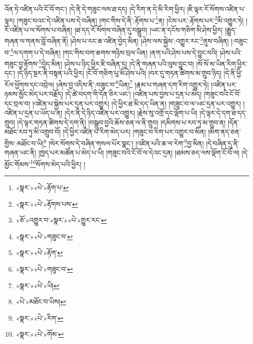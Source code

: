 འོན་ཏེ་འཛིན་པའི་ངོ་བོ་གང་། །དེ་ནི་དེ་གཟུང་ལས་ཐ་དད། །དེ་རིག་ན་དེ་མི་རིག་ཕྱིར། །ཇི་ལྟར་རོ་སོགས་འཛིན་པ་ལྟར། །གཟུང་བའང་དེ་འཛིན་པས་དེ་བཞིན། །གང་གིས་དེ་ནི་:རྟོགས་པ་\footnote{«སྣར་»«པེ་»རྟོག་པ་}ན། །ངེས་པར་:རྟོགས་པར་\footnote{«སྣར་»«པེ་»རྟོགས་པས་}མི་འགྱུར་ཏེ། །རོ་འཛིན་པ་ལ་སོགས་པ་བཞིན། །ཐ་དད་རོ་སོགས་བཞིན་དུ་བསྒྲུབ། །ཡང་ན་དངོས་གཅིག་མི་ཤེས་ཕྱིར། །རྒྱུད་གཞན་ལ་གནས་བློ་བཞིན་ནོ། །ཤེས་པ་རང་ཆ་འཛིན་བྱེད་མིན། །ཤེས་ལས་སྐྱེས་:འགྱུར་རང་\footnote{«ཅོ་»འགྱུར་བ་«སྣར་»«པེ་»གྱུར་རང་}ནུས་བཞིན། །:བཟུང་བ་\footnote{«སྣར་»«པེ་»གཟུང་བ་}ལ་དགག་པ་དེ་བཞིན། །གང་གིས་བག་ཆགས་གཉིས་བྲལ་ཡིན། །ནག་པའི་ཤེས་པས་དེ་བྱུང་བའི། །ཤེས་པའི་གཟུང་བྱ་རྟོགས་\footnote{«སྣར་»«པེ་»རྟོག་}བྱེད་མིན། །ཤེས་པ་ཉིད་ཕྱིར་ཇི་བཞིན་དུ། །དེ་ནི་གཞན་པའི་ལུས་བྱུང་བ། །སོ་སོ་མ་ཡིན་རིག་ཕྱིར་དང་། །དེ་ཉིད་སྔར་ནི་བསྟན་པའི་ཕྱིར། །ངོ་བོ་གཅིག་པུ་མི་ཤེས་པའི། །བར་དུ་གཏན་ཚིགས་མ་གྲུབ་ཉིད། །དེ་ནི་ཕྱི་རོལ་ཕྱོགས་དང་འབྲེལ། །ཞེས་བྱ་འདིས་ནི་:བཟུང་བ་\footnote{«སྣར་»«པེ་»གཟུང་བ་}ཡིན།\footnote{«སྣར་»«པེ་»ཡི།} །རྣམ་པ་གཞན་དག་རིག་འགྱུར་ཏེ། །འཛིན་པར་ཉམས་མྱོང་མེད་པར་བརྗོད། །དེ་ཚེ་བདག་གི་དོན་ཅིར་ཡང་། །འཛིན་པས་བྱས་པ་དྲན་པ་མེད། །གཟུང་བའི་ངོ་བོ་དང་བྲལ་བ། །འཛིན་པ་སྐྱེས་པར་དྲན་པར་འགྱུར། །དེ་ཕྱིར་ཐ་མི་དད་ཡིན་ན། །གཟུང་བ་ལ་ཡང་དྲན་པར་འགྱུར། །འཛིན་པ་དྲན་པ་ཡོད་པ་ན། །དེར་ནི་དེ་ཉིད་འཛིན་པར་འགྱུར། །རྗེས་སུ་འགྲོ་དང་ལྡོག་པ་ཡི། །དེ་ལྟར་དེ་དག་ཐ་དད་གྲུབ། །དེ་ལྟར་གཏན་ཚིགས་དེ་དག་ནི། །བསྒྲུབ་བྱའི་ཆོས་ཅན་ལ་ནི་གྲུབ། །དམིགས་པ་རབ་ཏུ་མ་གྲུབ་ན། །དོན་མཐོང་རབ་ཏུ་མི་འགྲུབ་བོ། །དེ་ཕྱིར་འཛིན་པ་རིག་མེད་པར། །གཟུང་བ་རིག་པར་འགྱུར་བ་མིན། །མིག་ནད་ཅན་གྱིས་:མཐོང་བ་ཡི།\footnote{«པེ་»མཐོང་བ་ཡིས།} །སེར་སོགས་དེ་བཞིན་གསལ་པོར་སྣང་། །འཛིན་པའི་ཆ་ལ་རེག་\footnote{«སྣར་»«པེ་»རིག་}བྱ་མིན། །དེ་བཞིན་དུ་ནི་གཞན་ཡང་ནི། །ཁྱད་པར་མཚོན་པ་མེད་པ་ཡི། །གཟུང་བའི་ངོ་བོ་ལ་དེའང་དྲན། །ཐམས་ཅད་ལས་ལྡོག་ངོ་བོ་ལ། །དེ་མྱོང་གོམས་\footnote{«སྣར་»«པེ་»གོམ་}སོགས་མེད་པའི་ཕྱིར། །
